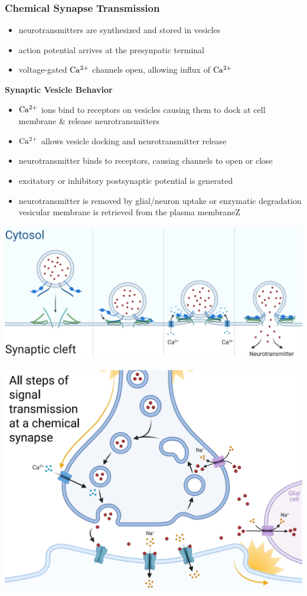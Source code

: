 \documentclass[11pt,fleqn]{book} %
\begin{document}
\subsubsection{Chemical Synapse Transmission}
\begin{itemize}
    \item neurotransmitters are synthesized and stored in vesicles
    \item action potential arrives at the presynpatic terminal
    \item voltage-gated ${\rm Ca^{2+}}$ channels open, allowing influx of ${\rm Ca^{2+}}$
\end{itemize}
\textbf{Synaptic Vesicle Behavior} 
\begin{itemize}
    \item ${\rm Ca^{2+}}$ ions bind to receptors on vesicles causing them to dock at cell membrane \& release neurotransmitters
    \item ${\rm Ca^{2+}}$ allows vesicle docking and neurotransmitter release
    \item neurotransmitter binds to receptors, causing channels to open or close
    \item excitatory or inhibitory postsynaptic potential is generated
    \item neurotransmitter is removed by glial/neuron uptake or enzymatic degradation
    vesicular membrane is retrieved from the plasma membraneZ
\end{itemize}
\begin{center}
    \includegraphics[width=0.65\linewidth]{Pictures/Screenshot 2024-02-26 011050.png}
\end{center}
\begin{center}
    \includegraphics[width=0.65\linewidth]{Pictures/Screenshot 2024-02-26 011404.png}
\end{center}
\end{document}
